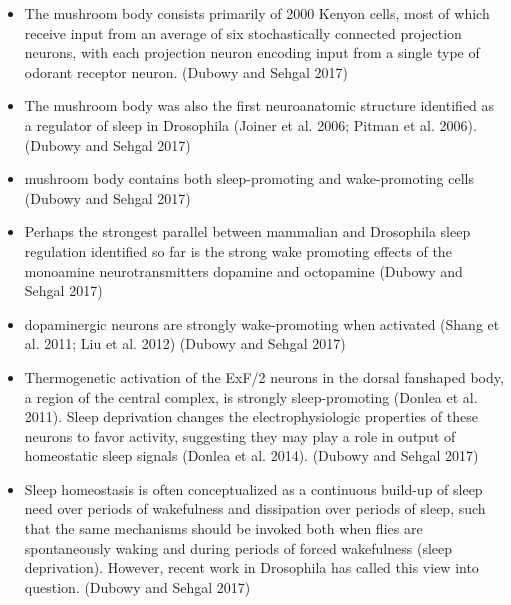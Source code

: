 \documentclass[11pt]{article}
\begin{document}
\begin{itemize}
    \item The mushroom body consists primarily of 2000 Kenyon cells, most of which receive input 
    from an average of six stochastically connected projection neurons, with each projection neuron 
    encoding input from a single type of odorant receptor neuron.
    \parencite{dubowyCircadianRhythmsSleep2017} (Dubowy and Sehgal 2017)

    \item The mushroom body was also the first neuroanatomic structure identified as a regulator of
     sleep in Drosophila (Joiner et al. 2006; Pitman et al. 2006).
     \parencite{dubowyCircadianRhythmsSleep2017} (Dubowy and Sehgal 2017)
    
    \item mushroom body contains both sleep-promoting and wake-promoting cells
    \parencite{dubowyCircadianRhythmsSleep2017} (Dubowy and Sehgal 2017)
    
    \item Perhaps the strongest parallel between mammalian and Drosophila sleep regulation
    identified so far is the strong wake promoting effects of the monoamine neurotransmitters
    dopamine and octopamine
    \parencite{dubowyCircadianRhythmsSleep2017} (Dubowy and Sehgal 2017)

    \item dopaminergic neurons are strongly wake-promoting when activated 
    (Shang et al. 2011; Liu et al. 2012)
    \parencite{dubowyCircadianRhythmsSleep2017} (Dubowy and Sehgal 2017)

    \item Thermogenetic activation of the ExF/2 neurons in the dorsal fanshaped body, a 
    region of the central complex, is strongly sleep-promoting (Donlea et al. 2011). Sleep 
    deprivation changes the electrophysiologic properties of these neurons to favor activity,
    suggesting they may play a role in output of homeostatic sleep signals (Donlea et al. 2014).
    \parencite{dubowyCircadianRhythmsSleep2017} (Dubowy and Sehgal 2017)

    \item Sleep homeostasis is often conceptualized as a continuous build-up of sleep need over
    periods of wakefulness and dissipation over periods of sleep, such that the same mechanisms
    should be invoked both when flies are spontaneously waking and during periods of forced 
    wakefulness (sleep deprivation). However, recent work in Drosophila has called this view 
    into question.
    \parencite{dubowyCircadianRhythmsSleep2017} (Dubowy and Sehgal 2017)


\end{itemize}
\end{document}
